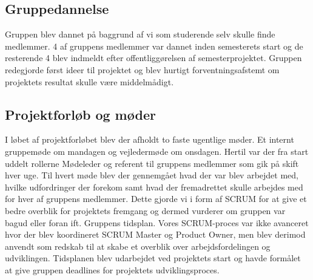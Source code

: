 \subsection{Gruppedannelse}
Gruppen blev dannet på baggrund af vi som studerende selv skulle finde medlemmer. 4 af gruppens medlemmer var dannet inden semesterets start og de resterende 4 blev indmeldt efter offentliggørelsen af semesterprojektet. Gruppen redegjorde først ideer til projektet og blev hurtigt forventningsafstemt om projektets resultat skulle være middelmådigt. 

\subsection{Projektforløb og møder}
I løbet af projektforløbet blev der afholdt to faste ugentlige møder. Et internt gruppemøde om mandagen og vejledermøde om onsdagen. Hertil var der fra start uddelt rollerne Mødeleder og referent til gruppens medlemmer som gik på skift hver uge. Til hvert møde blev der gennemgået hvad der var blev arbejdet med, hvilke udfordringer der forekom samt hvad der fremadrettet skulle arbejdes med for hver af gruppens medlemmer. Dette gjorde vi i form af SCRUM for at give et bedre overblik for projektets fremgang og dermed vurderer om gruppen var bagud eller foran ift. Gruppens tidsplan. Vores SCRUM-proces var ikke avanceret hvor der blev koordineret SCRUM Master og Product Owner, men blev derimod anvendt som redskab til at skabe et overblik over arbejdsfordelingen og udviklingen. Tidsplanen blev udarbejdet ved projektets start og havde formålet at give gruppen deadlines for projektets udviklingsproces. 
